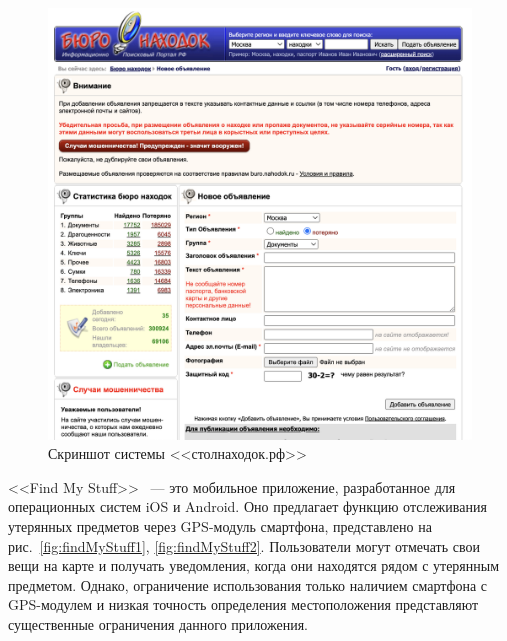 \begin{figure}[htb]
	\centering
	\includegraphics[width=.95\textwidth]{images/stolNahodok2}
	\parskip=6pt
	\caption{Скриншот системы <<столнаходок.рф>>}
	\label{fig:stolNahodok2}
\end{figure}

<<Find My Stuff>>~\cite{bib:find_my_stuff} --- это мобильное приложение, разработанное для операционных систем iOS и Android. Оно предлагает функцию отслеживания утерянных предметов через GPS-модуль смартфона, представлено на рис.~\ref{fig:findMyStuff1}, \ref{fig:findMyStuff2}. Пользователи могут отмечать свои вещи на карте и получать уведомления, когда они находятся рядом с утерянным предметом. Однако, ограничение использования только наличием смартфона с GPS-модулем и низкая точность определения местоположения представляют существенные ограничения данного приложения.

